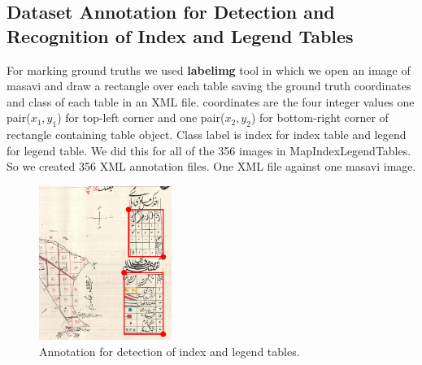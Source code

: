 \subsection{Dataset Annotation for Detection and Recognition of Index and Legend Tables}
\label{sec:dataset_table}
For marking ground truths we used \textbf{labelimg} tool in which we open an image of masavi and draw a rectangle over each table saving the ground truth coordinates and class of each table in an XML file. coordinates are the four integer values one pair($x_1,y_1$) for top-left corner and one pair($x_2,y_2$) for bottom-right corner of rectangle containing table object. Class label is index for index table and legend for legend table. We did this for all of the 356 images in MapIndexLegendTables. So we created 356 XML annotation files. One XML file against one masavi image.
\begin{figure}[h!]
    \centering
    \includegraphics[width=\linewidth,height=5cm,keepaspectratio]{annot_massavi_tables.png}
    \caption{Annotation for detection of index and legend tables.}
    \label{fig:TableAnnot}
\end{figure}

